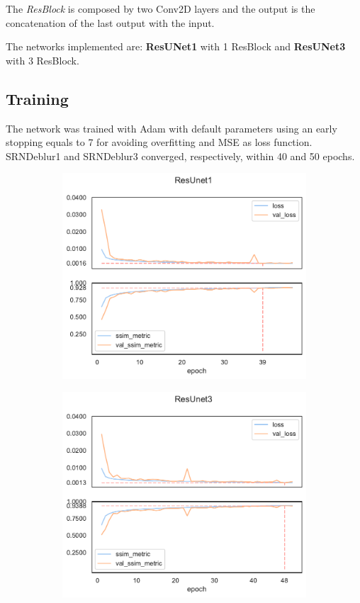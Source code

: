 The \textit{ResBlock} is composed by two Conv2D layers and the output is the concatenation of the last output with the input.  

The networks implemented are: \textbf{ResUNet1} with 1 ResBlock and \textbf{ResUNet3} with 3 ResBlock.

\subsection{Training}
The network was trained with Adam\cite{adam} with default parameters using an early stopping equals to 7 for avoiding overfitting and MSE as loss function.
SRNDeblur1 and SRNDeblur3 converged, respectively, within 40 and 50 epochs.
\begin{figure}[H]
    \begin{subfigure}{\textwidth}
        \centering
        \includegraphics[height=0.4\textheight,keepaspectratio]{subsections/resunet/plot_history_ResUNet1.pdf}            
    \end{subfigure}
    \begin{subfigure}{\textwidth}
        \centering
        \includegraphics[height=0.4\textheight,keepaspectratio]{subsections/resunet/plot_history_ResUNet3.pdf}            

\end{subfigure}
\end{figure}
